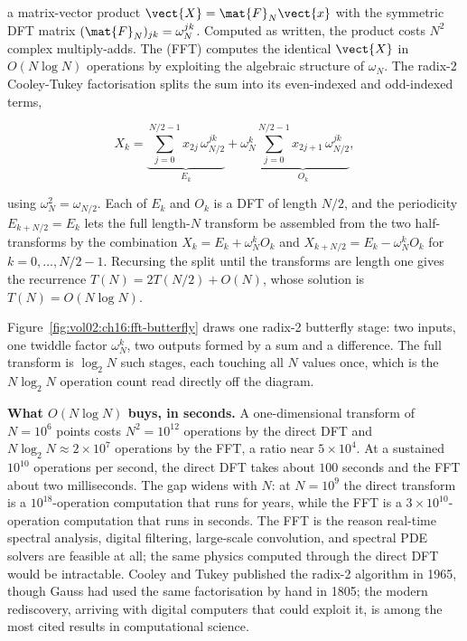 a matrix-vector product $\vect{X} = \mat{F}_{N}\vect{x}$ with the symmetric
DFT matrix $(\mat{F}_{N})_{jk} = \omega_{N}^{jk}$. Computed as written, the
product costs $N^{2}$ complex multiply-adds. The  (FFT) computes the identical $\vect{X}$ in $O(N \log N)$
operations by exploiting the algebraic structure of $\omega_{N}$. The
radix-2 Cooley-Tukey factorisation splits the sum into its even-indexed and
odd-indexed terms,

\[
X_{k} = \underbrace{\sum_{j=0}^{N/2-1} x_{2j}\,\omega_{N/2}^{jk}}_{E_{k}}
+ \omega_{N}^{k}\underbrace{\sum_{j=0}^{N/2-1} x_{2j+1}\,\omega_{N/2}^{jk}}_{O_{k}},
\]

using $\omega_{N}^{2} = \omega_{N/2}$. Each of $E_{k}$ and $O_{k}$ is a DFT
of length $N/2$, and the periodicity $E_{k+N/2} = E_{k}$ lets the full
length-$N$ transform be assembled from the two half-transforms by the
 combination $X_{k} = E_{k} + \omega_{N}^{k} O_{k}$ and
$X_{k+N/2} = E_{k} - \omega_{N}^{k} O_{k}$ for $k = 0, \ldots, N/2 - 1$.
Recursing the split until the transforms are length one gives the recurrence
$T(N) = 2 T(N/2) + O(N)$, whose solution is $T(N) = O(N \log N)$.



Figure~\ref{fig:vol02:ch16:fft-butterfly} draws one radix-2 butterfly stage:
two inputs, one twiddle factor $\omega_{N}^{k}$, two outputs formed by a
sum and a difference. The full transform is $\log_{2} N$ such stages, each
touching all $N$ values once, which is the $N \log_{2} N$ operation count
read directly off the diagram.

\begin{example}
\textbf{What $O(N \log N)$ buys, in seconds.} A one-dimensional transform of
$N = 10^{6}$ points costs $N^{2} = 10^{12}$ operations by the direct DFT and
$N \log_{2} N \approx 2 \times 10^{7}$ operations by the FFT, a ratio near
$5 \times 10^{4}$. At a sustained $10^{10}$ operations per second, the direct
DFT takes about $100$ seconds and the FFT about two milliseconds. The gap
widens with $N$: at $N = 10^{9}$ the direct transform is a $10^{18}$-operation
computation that runs for years, while the FFT is a $3 \times 10^{10}$-operation
computation that runs in seconds. The FFT is the reason real-time spectral
analysis, digital filtering, large-scale convolution, and spectral PDE
solvers are feasible at all; the same physics computed through the direct DFT
would be intractable. Cooley and Tukey published the radix-2 algorithm in
1965, though Gauss had used the same factorisation by hand in 1805; the
modern rediscovery, arriving with digital computers that could exploit it,
is among the most cited results in computational science.
\end{example}

